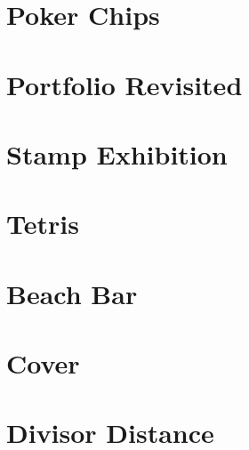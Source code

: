 \documentclass[a4paper, 10pt]{article}
\let\stdsection\section
\renewcommand\section{\newpage\stdsection}
\newcommand{\includecode}[1]{
    }
\begin{document}
    
    \section{Poker Chips}
        \includecode{../problems/w10/Poker_Chips/PokerChips1.cpp}
        
    \section{Portfolio Revisited}
        \includecode{../problems/w10/Portfolios_Revisited/PortfolioRevisited1.cpp}
        
    \section{Stamp Exhibition}
        \includecode{../problems/w10/Stamp_Exhibition/Stamps1.cpp}
        
    \section{Tetris}
        \includecode{../problems/w10/Tetris/Tetris1.cpp}
 
    
    \section{Beach Bar}
        \includecode{../problems/w11/Beach_Bar/BeachBar1.cpp}
        
    \section{Cover}
        \includecode{../problems/w11/Cover/Cover1.cpp}
        
    \section{Divisor Distance}
        \includecode{../problems/w11/Divisor_Distance/DivisorDistance1.cpp}
        
\end{document}
